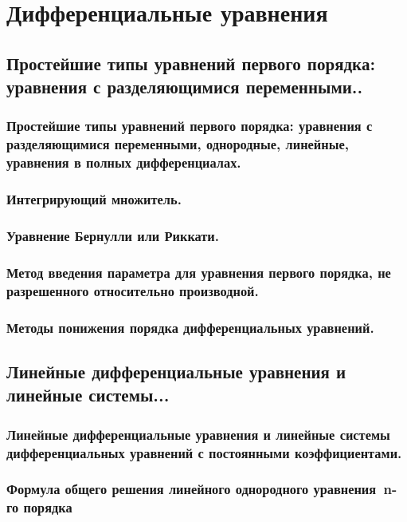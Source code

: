 \newpage
\section{Дифференциальные уравнения}
\subsection{Простейшие типы уравнений первого порядка: уравнения с разделяющимися переменными..}
\subsubsection{Простейшие типы уравнений первого порядка: уравнения с разделяющимися переменными, однородные, линейные, уравнения в полных дифференциалах.}


\subsubsection{Интегрирующий множитель.}

\subsubsection{Уравнение Бернулли или Риккати.}

\subsubsection{ Метод введения параметра для уравнения первого порядка, не разрешенного относительно производной.}

\subsubsection{Методы понижения порядка дифференциальных уравнений. }

\newpage 
\subsection{Линейные дифференциальные уравнения и линейные системы...}
\subsubsection{Линейные дифференциальные уравнения и линейные системы дифференциальных уравнений с постоянными коэффициентами.}

\subsubsection{Формула общего решения линейного однородного уравнения n-го порядка}

